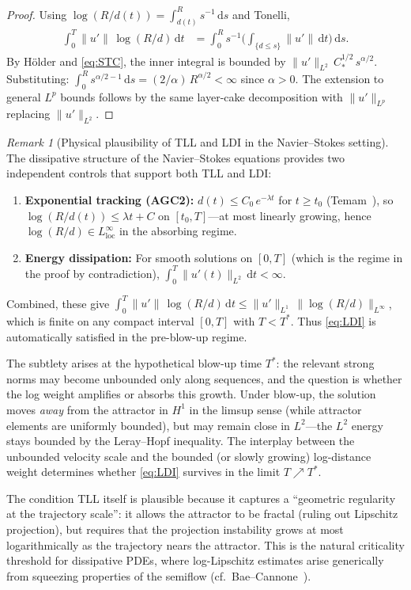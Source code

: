 \documentclass[12pt,a4paper]{article}
\theoremstyle{definition}
\theoremstyle{plain}
\theoremstyle{remark}
\newtheorem{remark}[definition]{Remark}
\begin{document}
\begin{proof}
Using $\log(R/d(t)) = \int_{d(t)}^R s^{-1}\,\mathrm{d}s$ and Tonelli,
\[
\begin{aligned}
\int_0^T \|u'\|\,\log(R/d)\,\mathrm{d}t
&= \int_0^R s^{-1}
   \biggl(\int_{\{d \le s\}} \|u'\|\,\mathrm{d}t\biggr)\,\mathrm{d}s .
\end{aligned}
\]
By H\"older and \eqref{eq:STC}, the inner integral is bounded by
$\|u'\|_{L^2}\,C_*^{1/2}\,s^{\alpha/2}$.  Substituting:
$\int_0^R s^{\alpha/2-1}\,\mathrm{d}s = (2/\alpha)\,R^{\alpha/2} < \infty$
since $\alpha > 0$.
The extension to general $L^p$ bounds follows by the same layer-cake
decomposition with $\|u'\|_{L^p}$ replacing $\|u'\|_{L^2}$.
\end{proof}

\begin{remark}[Physical plausibility of TLL and LDI in the
Navier--Stokes setting]
\label{rem:LDI-plausibility}
The dissipative structure of the Navier--Stokes equations provides
two independent controls that support both TLL and LDI:
\begin{enumerate}[label=(\roman*)]
  \item \textbf{Exponential tracking (AGC2):}\;
    $d(t) \le C_0\,e^{-\lambda t}$ for $t \ge t_0$
    (Temam~\cite{Temam2001}), so
    $\log(R/d(t)) \le \lambda t + C$ on $[t_0, T]$---at most
    linearly growing, hence $\log(R/d) \in L^\infty_{\mathrm{loc}}$
    in the absorbing regime.
  \item \textbf{Energy dissipation:}\;
    For smooth solutions on $[0,T]$ (which is the regime in the
    proof by contradiction),
    $\int_0^T \|u'(t)\|_{L^2}\,\mathrm{d}t < \infty$.
\end{enumerate}
Combined, these give
$\int_0^T \|u'\|\,\log(R/d)\,\mathrm{d}t
\le \|u'\|_{L^1}\,\|\log(R/d)\|_{L^\infty}$,
which is finite on any compact interval $[0,T]$ with
$T < T^*$. Thus \eqref{eq:LDI} is automatically satisfied
in the pre-blow-up regime.

The subtlety arises at the hypothetical blow-up time $T^*$:
the relevant strong norms may become unbounded only along sequences,
and the question is whether the log weight amplifies or absorbs this
growth.  Under blow-up, the solution moves \emph{away} from the
attractor in $H^1$ in the limsup sense (while attractor elements are
uniformly bounded), but may remain close in $L^2$---the $L^2$ energy
stays bounded by the Leray--Hopf inequality.  The interplay between
the unbounded velocity scale and the bounded (or slowly growing)
log-distance weight determines whether \eqref{eq:LDI}
survives in the limit $T \nearrow T^*$.

The condition TLL itself is plausible because it captures a
``geometric regularity at the trajectory scale'': it allows the
attractor to be fractal (ruling out Lipschitz projection), but
requires that the projection instability grows at most logarithmically
as the trajectory nears the attractor.
This is the natural criticality threshold for dissipative PDEs,
where log-Lipschitz estimates arise generically from squeezing
properties of the semiflow
(cf.\ Bae--Cannone~\cite{BaeCannone2016}).
\end{remark}
\end{document}
